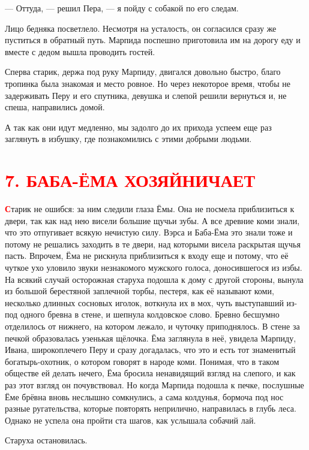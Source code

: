 \documentclass[12pt, a4paper, openany]{book}
\begin{document}
	— Оттуда, — решил Пера, — я пойду с собакой по его следам.
	
	Лицо бедняка посветлело. Несмотря на усталость, он согласился сразу же пуститься в обратный путь. Марпида поспешно приготовила им на дорогу еду и вместе с дедом вышла проводить гостей.
	
	Сперва старик, держа под руку Марпиду, двигался довольно быстро, благо тропинка была знакомая и место ровное. Но через некоторое время, чтобы не задерживать Перу и его спутника, девушка и слепой решили вернуться и, не спеша, направились домой.
	
	А так как они идут медленно, мы задолго до их прихода успеем еще раз заглянуть в избушку, где познакомились с этими добрыми людьми.
	
	\section[7. Баба-Ёма хозяйничает]{\center \textcolor{red}{7. БАБА-ЁМА ХОЗЯЙНИЧАЕТ}}
	
	\lettrine[findent=0pt]{\textbf{\textcolor{red}{С}}}{}тарик не ошибся: за ним следили глаза Ёмы. Она не посмела приблизиться к двери, так как над нею висели большие щучьи зубы. А все древние коми знали, что это отпугивает всякую нечистую силу. Вэрса и Баба-Ёма это знали тоже и потому не решались заходить в те двери, над которыми висела раскрытая щучья пасть. Впрочем, Ёма не рискнула приблизиться к входу еще и потому, что её чуткое ухо уловило звуки незнакомого мужского голоса, доносившегося из избы. На всякий случай осторожная старуха подошла к дому с другой стороны, вынула из большой берестяной заплечной торбы, пестеря, как её называют коми, несколько длинных сосновых иголок, воткнула их в мох, чуть выступавший из-под одного бревна в стене, и шепнула колдовское слово. Бревно бесшумно отделилось от нижнего, на котором лежало, и чуточку приподнялось. В стене за печкой образовалась узенькая щёлочка. Ёма заглянула в неё, увидела Марпиду, Ивана, широкоплечего Перу и сразу догадалась, что это и есть тот знаменитый богатырь-охотник, о котором говорят в народе коми. Понимая, что в таком обществе ей делать нечего, Ёма бросила ненавидящий взгляд на слепого, и как раз этот взгляд он почувствовал. Но когда Марпида подошла к печке, послушные Ёме брёвна вновь неслышно сомкнулись, а сама колдунья, бормоча под нос разные ругательства, которые повторять неприлично, направилась в глубь леса. Однако не успела она пройти ста шагов, как услышала собачий лай.
	
	Старуха остановилась.
	
\end{document}
